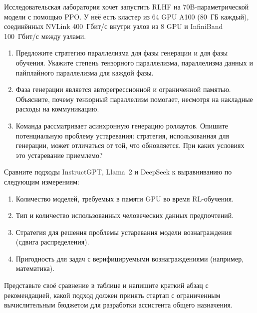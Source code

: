 \begin{exercise}
\label{ex:scaling-design}
Исследовательская лаборатория хочет запустить RLHF на 70B-параметрической модели с помощью PPO. У неё есть кластер из 64 GPU A100 (80~ГБ каждый), соединённых NVLink 400~Гбит/с внутри узлов из 8 GPU и InfiniBand 100~Гбит/с между узлами.
\begin{enumerate}
  \item Предложите стратегию параллелизма для фазы генерации и для фазы обучения. Укажите степень тензорного параллелизма, параллелизма данных и пайплайного параллелизма для каждой фазы.
  \item Фаза генерации является авторегрессионной и ограниченной памятью. Объясните, почему тензорный параллелизм помогает, несмотря на накладные расходы на коммуникацию.
  \item Команда рассматривает асинхронную генерацию роллаутов. Опишите потенциальную проблему устаревания: стратегия, использованная для генерации, может отличаться от той, что обновляется. При каких условиях это устаревание приемлемо?
\end{enumerate}
\end{exercise}

\begin{exercise}
\label{ex:case-study-comparison}
Сравните подходы InstructGPT, Llama~2 и DeepSeek к выравниванию по следующим измерениям:
\begin{enumerate}
  \item Количество моделей, требуемых в памяти GPU во время RL-обучения.
  \item Тип и количество использованных человеческих данных предпочтений.
  \item Стратегия для решения проблемы устаревания модели вознаграждения (сдвига распределения).
  \item Пригодность для задач с верифицируемыми вознаграждениями (например, математика).
\end{enumerate}
Представьте своё сравнение в таблице и напишите краткий абзац с рекомендацией, какой подход должен принять стартап с ограниченным вычислительным бюджетом для разработки ассистента общего назначения.
\end{exercise}
